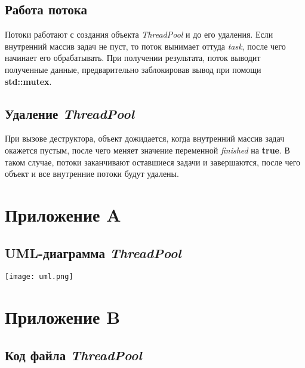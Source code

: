 \documentclass[a4paper, 12pt]{article}
\begin{document}
\subsection{Работа потока}
Потоки работают с создания объекта \textit{ThreadPool} и до его удаления. Если
внутренний массив задач не пуст, то поток вынимает оттуда \textit{task}, после чего
начинает его обрабатывать. При получении результата, поток выводит полученные данные, 
предварительно заблокировав вывод при помощи \textbf{std::mutex}. 

\subsection{Удаление \textit{ThreadPool}}
При вызове деструктора, объект дожидается, когда внутренний массив задач окажется пустым,
после чего меняет значение переменной \textit{finished} на \textbf{true}.
В таком случае, потоки заканчивают оставшиеся задачи и завершаются, после чего 
объект и все внутренние потоки будут удалены.


\cleardoublepage


\section*{Приложение A}
\renewcommand\thesection{\Alph{section}}
\renewcommand\thesubsection{\thesection.\arabic{subsection}}
\setcounter{subsection}{0}

\subsection{UML-диаграмма \textit{ThreadPool}}
\texttt{[image: uml.png]}


\cleardoublepage

\setcounter{subsection}{0}
\section*{Приложение B}
\renewcommand\thesection{\Alph{section}}
\renewcommand\thesubsection{B.\arabic{subsection}}

\subsection{Код файла \textit{ThreadPool}}
\end{document}
